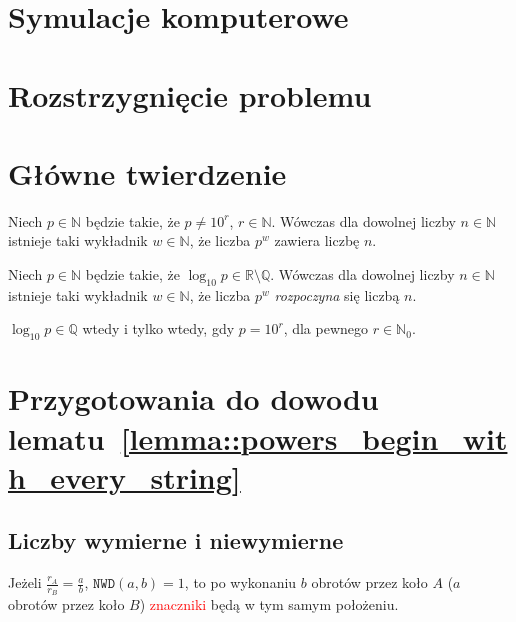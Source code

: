 \documentclass[aspectratio=169]{beamer}
\newcommand{\R}{\mathbb{R}}
\newcommand{\Q}{\mathbb{Q}}
\newcommand{\N}{\mathbb{N}}
\renewcommand{\gcd}[2]{\mathtt{NWD}\paren{#1, #2}}
\newcommand{\define}[1]{\textit{#1}}
\newcommand{\paren}[1]{\!\left(#1 \right)}
\begin{document}
\section{Symulacje komputerowe}

{\expSubstrPlotsTex}

\section{Rozstrzygnięcie problemu}
\section{Główne twierdzenie}

\begin{frame}
  \pause{} \begin{theorem}
    Niech $p \in \N$ będzie takie, że $p \not = 10^r$, $r \in \N$.
    Wówczas dla dowolnej liczby $n \in \N$ istnieje taki wykładnik $w \in \N$, że liczba $p^w$ zawiera liczbę $n$.
  \end{theorem}
  \pause{} \begin{lemma}
    \label{lemma::powers_begin_with_every_string}
    Niech $p \in \N$ będzie takie, że $\log_{10}p \in \R \setminus \Q$.
    Wówczas dla dowolnej liczby $n \in \N$ istnieje taki wykładnik $w \in \N$, że liczba $p^w$ \define{rozpoczyna} się liczbą $n$. 
  \end{lemma}
  \pause{} \begin{lemma}
    \label{lemma::log_10_rational_iff}
    $\log_{10}p \in \Q$ wtedy i tylko wtedy, gdy $p = 10^r$, dla pewnego $r \in \N_0$.
  \end{lemma}
\end{frame}

\section{\texorpdfstring{Przygotowania do dowodu lematu~\protect\ref{lemma::powers_begin_with_every_string}}{Przygotowania do dowodu głównego lematu}}
\subsection{Liczby wymierne i niewymierne}

\begin{frame}
  \begin{figure}
    {\wheelsRationalTex}
  \end{figure}
  \begin{theorem}
  Jeżeli $\frac{r_A}{r_B} = \frac{a}{b}$, $\gcd{a}{b} = 1$, to po wykonaniu $b$ obrotów przez koło $A$ ($a$ obrotów przez koło $B$)
  \textcolor{red}{znaczniki} będą w tym samym położeniu.
  \end{theorem}
\end{frame}
\end{document}
